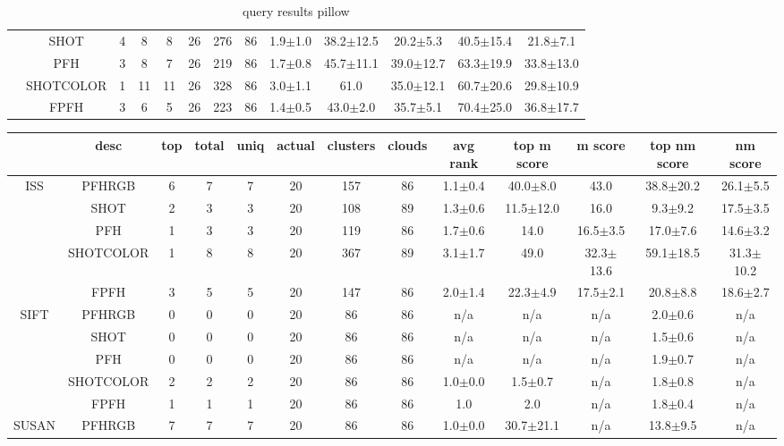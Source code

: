 \documentclass[11pt,a4paper]{kth-mag}
\begin{document}
\begin{landscape}
\begin{table}
\begin{tabular}{cc|ccccccccccc}
      &SHOT & 4 & 8 & 8 & 26 & 276 & 86 & 1.9$\pm$1.0 & 38.2$\pm$12.5 & 20.2$\pm$5.3 & 40.5$\pm$15.4 & 21.8$\pm$7.1\\
      &PFH & 3 & 8 & 7 & 26 & 219 & 86 & 1.7$\pm$0.8 & 45.7$\pm$11.1 & 39.0$\pm$12.7 & 63.3$\pm$19.9 & 33.8$\pm$13.0\\
      &SHOTCOLOR & 1 & 11 & 11 & 26 & 328 & 86 & 3.0$\pm$1.1 & 61.0 & 35.0$\pm$12.1 & 60.7$\pm$20.6 & 29.8$\pm$10.9\\
      &FPFH & 3 & 6 & 5 & 26 & 223 & 86 & 1.4$\pm$0.5 & 43.0$\pm$2.0 & 35.7$\pm$5.1 & 70.4$\pm$25.0 & 36.8$\pm$17.7\\
    \end{tabular}
    \caption{query results pillow}
    \label{tab:qpillow}
  \end{table}
  \begin{table}
    \begin{tabular}{cc|ccccccccccc}
      & desc & top & total & uniq & actual & clusters & clouds & avg rank & top m score & m score & top nm score & nm score\\\hline
      \multirow{5}{*}{ISS} & PFHRGB & 6 & 7 & 7 & 20 & 157 & 86 & 1.1$\pm$0.4 & 40.0$\pm$8.0 & 43.0 & 38.8$\pm$20.2 & 26.1$\pm$5.5\\
      &SHOT & 2 & 3 & 3 & 20 & 108 & 89 & 1.3$\pm$0.6 & 11.5$\pm$12.0 & 16.0 & 9.3$\pm$9.2 & 17.5$\pm$3.5\\
      &PFH & 1 & 3 & 3 & 20 & 119 & 86 & 1.7$\pm$0.6 & 14.0 & 16.5$\pm$3.5 & 17.0$\pm$7.6 & 14.6$\pm$3.2\\
      &SHOTCOLOR & 1 & 8 & 8 & 20 & 367 & 89 & 3.1$\pm$1.7 & 49.0 & 32.3$\pm$13.6 & 59.1$\pm$18.5 & 31.3$\pm$10.2\\
      &FPFH & 3 & 5 & 5 & 20 & 147 & 86 & 2.0$\pm$1.4 & 22.3$\pm$4.9 & 17.5$\pm$2.1 & 20.8$\pm$8.8 & 18.6$\pm$2.7\\
      \hline\multirow{5}{*}{SIFT} & PFHRGB & 0 & 0 & 0 & 20 & 86 & 86 & n/a & n/a & n/a & 2.0$\pm$0.6 & n/a\\
      &SHOT & 0 & 0 & 0 & 20 & 86 & 86 & n/a & n/a & n/a & 1.5$\pm$0.6 & n/a\\
      &PFH & 0 & 0 & 0 & 20 & 86 & 86 & n/a & n/a & n/a & 1.9$\pm$0.7 & n/a\\
      &SHOTCOLOR & 2 & 2 & 2 & 20 & 86 & 86 & 1.0$\pm$0.0 & 1.5$\pm$0.7 & n/a & 1.8$\pm$0.8 & n/a\\
      &FPFH & 1 & 1 & 1 & 20 & 86 & 86 & 1.0 & 2.0 & n/a & 1.8$\pm$0.4 & n/a\\
      \hline\multirow{5}{*}{SUSAN} & PFHRGB & 7 & 7 & 7 & 20 & 86 & 86 & 1.0$\pm$0.0 & 30.7$\pm$21.1 & n/a & 13.8$\pm$9.5 & n/a\\

\end{tabular}
\end{table}
\end{landscape}
\end{document}
